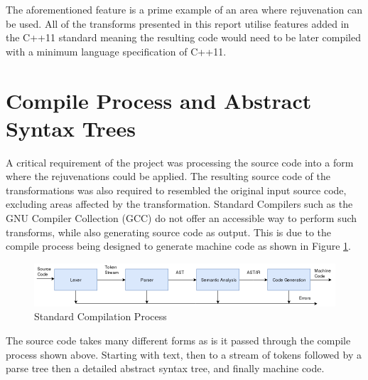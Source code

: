 \documentclass[bsc,frontabs,singlespacing,twoside,parskip,deptreport]{infthesis}
\begin{document}
The aforementioned feature is a prime example of an area where rejuvenation can be used. All of the transforms presented in this report utilise features added in the C++11 standard meaning the resulting code would need to be later compiled with a minimum language specification of C++11. 


\section{Compile Process and Abstract Syntax Trees}
A critical requirement of the project was processing the source code into a form where the rejuvenations could be applied. The resulting source code of the transformations was also required to resembled the original input source code, excluding areas affected by the transformation. Standard Compilers such as the GNU Compiler Collection (GCC) \cite{GCC} do not offer an accessible way to perform such transforms, while also generating source code as output. This is due to the compile process being designed to generate machine code as shown in Figure \ref{fig:comp_proc}.

\begin{figure}[!h]
    \centering
    \includegraphics[width=\textwidth]{images/Compilation-process.png}
    \caption{Standard Compilation Process}
    \label{fig:comp_proc}
\end{figure}
The source code takes many different forms as is it passed through the compile process shown above. Starting with text, then to a stream of tokens followed by a parse tree then a detailed abstract syntax tree, and finally machine code. 
\end{document}
